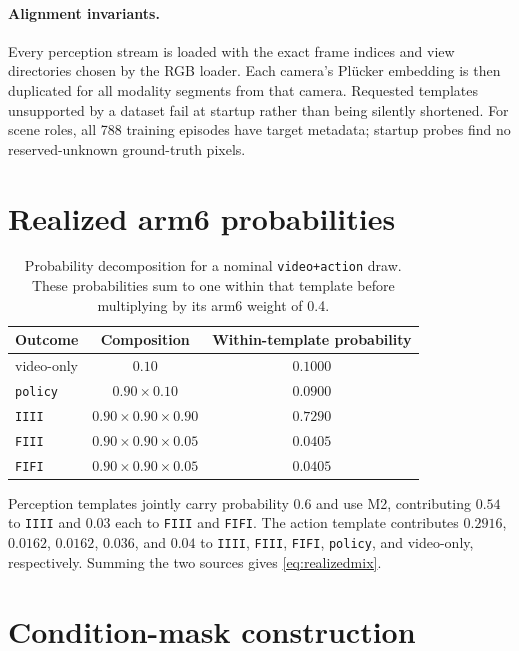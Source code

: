 \documentclass{article}
\newcommand{\code}[1]{\texttt{#1}}
\begin{document}
\paragraph{Alignment invariants.}
Every perception stream is loaded with the exact frame indices and view directories chosen by the
RGB loader. Each camera's Pl\"ucker embedding is then duplicated for all modality segments from
that camera. Requested templates unsupported by a dataset fail at startup rather than being
silently shortened. For scene roles, all 788 training episodes have target metadata; startup
probes find no reserved-unknown ground-truth pixels.

\section{Realized arm6 probabilities}
\label{app:mixture}

\begin{table}[h]
\caption{Probability decomposition for a nominal \code{video+action} draw. These probabilities
sum to one within that template before multiplying by its arm6 weight of 0.4.}
\label{tab:actionmix}
\centering
\small
\begin{tabular}{lcc}
\toprule
\textbf{Outcome} & \textbf{Composition} & \textbf{Within-template probability} \\
\midrule
video-only & $0.10$ & $0.1000$ \\
\code{policy} & $0.90\times0.10$ & $0.0900$ \\
\code{IIII} & $0.90\times0.90\times0.90$ & $0.7290$ \\
\code{FIII} & $0.90\times0.90\times0.05$ & $0.0405$ \\
\code{FIFI} & $0.90\times0.90\times0.05$ & $0.0405$ \\
\bottomrule
\end{tabular}
\end{table}

Perception templates jointly carry probability 0.6 and use M2, contributing $0.54$ to
\code{IIII} and $0.03$ each to \code{FIII} and \code{FIFI}. The action template contributes
$0.2916$, $0.0162$, $0.0162$, $0.036$, and $0.04$ to \code{IIII}, \code{FIII}, \code{FIFI},
\code{policy}, and video-only, respectively. Summing the two sources gives
\eqref{eq:realizedmix}.

\section{Condition-mask construction}
\end{document}
